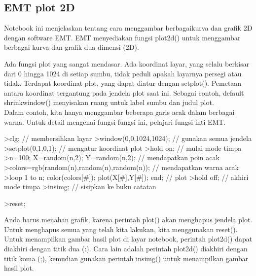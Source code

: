 \documentclass[12pt,arial,letterpaper]{book}
\begin{document}
\begin{eulernootebook}
\begin{eulercomment}
\begin{eulercomment}
\begin{eulernootebook}
\begin{eulercomment}
\begin{eulercomment}
\begin{eulercomment}
\begin{eulercomment}
\begin{eulercomment}
\begin{eulercomment}
\begin{eulercomment}
\chapter{EMT plot 2D}
\begin{eulernotebook}
\begin{eulercomment}
Notebook ini menjelaskan tentang cara menggambar berbagaikurva dan
grafik 2D dengan software EMT. EMT menyediakan fungsi plot2d() untuk
menggambar berbagai kurva dan grafik dua dimensi (2D).\\
\end{eulercomment}
\begin{eulercomment}
Ada fungsi plot yang sangat mendasar. Ada koordinat layar, yang selalu
berkisar dari 0 hingga 1024 di setiap sumbu, tidak peduli apakah
layarnya persegi atau tidak. Terdapat koordinat plot, yang dapat
diatur dengan setplot(). Pemetaan antara koordinat tergantung pada
jendela plot saat ini. Sebagai contoh, default shrinkwindow()
menyisakan ruang untuk label sumbu dan judul plot.\\
Dalam contoh, kita hanya menggambar beberapa garis acak dalam berbagai
warna. Untuk detail mengenai fungsi-fungsi ini, pelajari fungsi inti
EMT.
\end{eulercomment}
\begin{eulerprompt}
>clg; // membersihkan layar
>window(0,0,1024,1024); // gunakan semua jendela
>setplot(0,1,0,1); // mengatur koordinat plot
>hold on; // mulai mode timpa
>n=100; X=random(n,2); Y=random(n,2);  // mendapatkan poin acak
>colors=rgb(random(n),random(n),random(n)); // mendapatkan warna acak
>loop 1 to n; color(colors[#]); plot(X[#],Y[#]); end; // plot
>hold off; // akhiri mode timpa
>insimg; // sisipkan ke buku catatan
\end{eulerprompt}
\begin{eulerprompt}
>reset;
\end{eulerprompt}
\begin{eulercomment}
Anda harus menahan grafik, karena perintah plot() akan menghapus
jendela plot. Untuk menghapus semua yang telah kita lakukan, kita
menggunakan reset().\\
Untuk menampilkan gambar hasil plot di layar notebook, perintah
plot2d() dapat diakhiri dengan titik dua (:). Cara lain adalah
perintah plot2d() diakhiri dengan titik koma (;), kemudian gunakan
perintah insimg() untuk menampilkan gambar hasil plot.\\

\end{eulercomment}
\end{eulernotebook}
\end{eulercomment}
\end{eulercomment}
\end{eulercomment}
\end{eulercomment}
\end{eulercomment}
\end{eulercomment}
\end{eulercomment}
\end{eulernootebook}
\end{eulercomment}
\end{eulercomment}
\end{eulernootebook}
\end{document}
